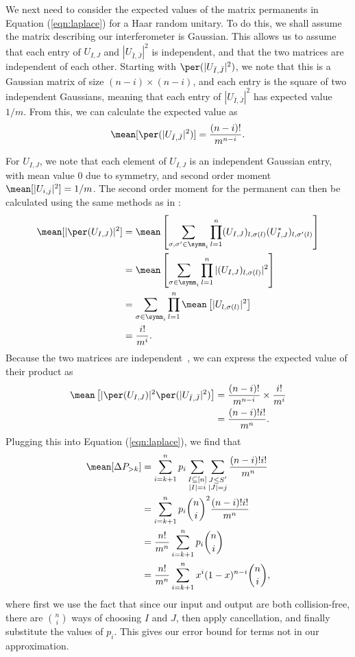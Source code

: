 We next need to consider the expected values of the matrix permanents in Equation (\ref{eqn:laplace}) for a Haar random unitary. 
To do this, we shall assume the matrix describing our interferometer is Gaussian. 
This allows us to assume that each entry of $U_{I,J}$ and $|U_{\bar{I},\bar{J}}|^2$ is independent, and that the two matrices are independent of each other. 
Starting with $\per(|U_{\bar{I},\bar{J}}|^2)$, we note that this is a Gaussian matrix of size $(n-i)\times(n-i)$, and each entry is the square of two independent Gaussians, meaning that each entry of $|U_{\bar{I},\bar{J}}|^2$ has expected value $1/m$. 
From this, we can calculate the expected value as
\begin{equation}
\mean[\per(|U_{\bar{I},\bar{J}}|^2)] = \frac{(n-i)!}{m^{n-i}}.
\end{equation}

For $U_{I,J}$, we note that each element of $U_{I,J}$ is an independent Gaussian entry, with mean value $0$ due to symmetry, and second order moment $\mean[|U_{i,j}|^2] = 1/m$. The second order moment for the permanent can then be calculated using the same methods as in \cite{aaronson2011}:
\begin{align}
\mean[|\per(U_{I,J})|^2] &= \mean\left[\sum_{\sigma,\sigma'\in\symm_i}\prod_{l=1}^n(U_{I,J})_{l,\sigma(l)}(U^*_{I,J})_{l,\sigma'(l)}\right]\\
&= \mean\left[\sum_{\sigma\in\symm_i}\prod_{l=1}^n|(U_{I,J})_{l,\sigma(l)}|^2\right]\\
&= \sum_{\sigma\in\symm_i}\prod_{l=1}^n\mean\left[|U_{l,\sigma(l)}|^2\right]\\
&= \frac{i!}{m^{i}}.
\end{align}
Because the two matrices are independent~\cite{renema2018}, we can express the expected value of their product as
\begin{align}
\mean\left[|\per(U_{I,J})|^2\per(|U_{\bar{I},\bar{J}}|^2)\right] &= \frac{(n-i)!}{m^{n-i}}\times\frac{i!}{m^{i}}\\
&= \frac{(n-i)!i!}{m^n}.
\end{align}
Plugging this into Equation (\ref{eqn:laplace}), we find that
\begin{align}
\mean[\Delta P_{>k}] &= \sum_{i=k+1}^np_i\sum_{\substack{I\subseteq[n]\\|I|=i}}\sum_{\substack{J\leq S'\\|J|=j}}\frac{(n-i)!i!}{m^n}\\
&= \sum_{i=k+1}^np_i\binom{n}{i}^2\frac{(n-i)!i!}{m^n}\\
&= \frac{n!}{m^n}\sum_{i=k+1}^np_i\binom{n}{i}\\
&= \frac{n!}{m^n}\sum_{i=k+1}^nx^i(1-x)^{n-i}\binom{n}{i},
\end{align}
where first we use the fact that since our input and output are both collision-free, there are $\binom{n}{i}$ ways of choosing $I$ and $J$, then apply cancellation, and finally substitute the values of $p_i$. 
This gives our error bound for terms not in our approximation.

